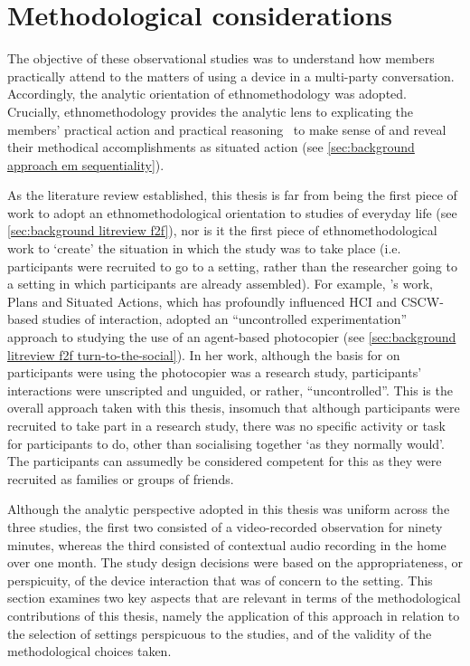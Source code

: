


\section{Methodological considerations}\label{sec:synopsis discussion method}
\begin{revisedsubmission}
The objective of these observational studies was to understand how members practically attend to the matters of using a device in a multi-party conversation.
Accordingly, the analytic orientation of ethnomethodology was adopted.
Crucially, ethnomethodology provides the analytic lens to explicating the members' practical action and practical reasoning~\citep[p. 27]{Crabtree2012} to make sense of and reveal their methodical accomplishments as situated action (see \ref{sec:background approach em sequentiality}).

As the literature review established, this thesis is far from being the first piece of work to adopt an ethnomethodological orientation to studies of everyday life (see \ref{sec:background litreview f2f}), nor is it the first piece of ethnomethodological work to `create' the situation in which the study was to take place (i.e. participants were recruited to go to a setting, rather than the researcher going to a setting in which participants are already assembled).
For example, \citet{Suchman1985}'s work, Plans and Situated Actions, which has profoundly influenced \ac{HCI} and \ac{CSCW}-based studies of interaction, adopted an ``uncontrolled experimentation''~\citep[p. 114]{Suchman1985} approach to studying the use of an agent-based photocopier (see \ref{sec:background litreview f2f turn-to-the-social}).
In her work, although the basis for on participants were using the photocopier was a research study, participants' interactions were unscripted and unguided, or rather, ``uncontrolled''.
This is the overall approach taken with this thesis, insomuch that although participants were recruited to take part in a research study, there was no specific activity or task for participants to do, other than socialising together `as they normally would'.
The participants can assumedly be considered competent for this as they were recruited as families or groups of friends.

Although the analytic perspective adopted in this thesis was uniform across the three studies, the first two consisted of a video-recorded observation for ninety minutes, whereas the third consisted of contextual audio recording in the home over one month.
The study design decisions were based on the appropriateness, or perspicuity, of the device interaction that was of concern to the setting.
This section examines two key aspects that are relevant in terms of the methodological contributions of this thesis, namely the application of this approach in relation to the selection of settings perspicuous to the studies, and of the validity of the methodological choices taken.
\end{revisedsubmission}




